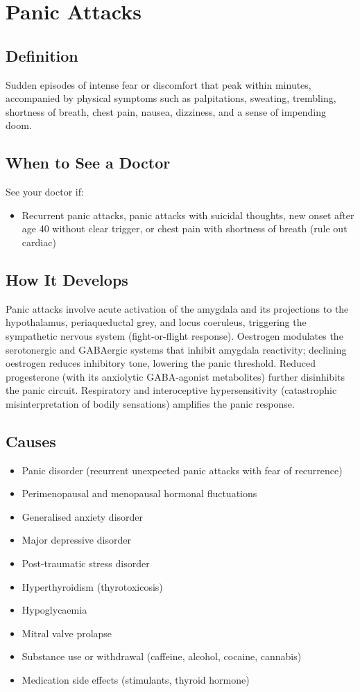 \chapter{Panic Attacks}

\section*{Definition}
Sudden episodes of intense fear or discomfort that peak within minutes, accompanied by physical symptoms such as palpitations, sweating, trembling, shortness of breath, chest pain, nausea, dizziness, and a sense of impending doom.

\section*{When to See a Doctor}
See your doctor if:
\begin{itemize}
  \item Recurrent panic attacks, panic attacks with suicidal thoughts, new onset after age 40 without clear trigger, or chest pain with shortness of breath (rule out cardiac)
\end{itemize}

\section*{How It Develops}
Panic attacks involve acute activation of the amygdala and its projections to the hypothalamus, periaqueductal grey, and locus coeruleus, triggering the sympathetic nervous system (fight-or-flight response). Oestrogen modulates the serotonergic and GABAergic systems that inhibit amygdala reactivity; declining oestrogen reduces inhibitory tone, lowering the panic threshold. Reduced progesterone (with its anxiolytic GABA-agonist metabolites) further disinhibits the panic circuit. Respiratory and interoceptive hypersensitivity (catastrophic misinterpretation of bodily sensations) amplifies the panic response.

\section*{Causes}
\begin{itemize}
  \item Panic disorder (recurrent unexpected panic attacks with fear of recurrence)
  \item Perimenopausal and menopausal hormonal fluctuations
  \item Generalised anxiety disorder
  \item Major depressive disorder
  \item Post-traumatic stress disorder
  \item Hyperthyroidism (thyrotoxicosis)
  \item Hypoglycaemia
  \item Mitral valve prolapse
  \item Substance use or withdrawal (caffeine, alcohol, cocaine, cannabis)
  \item Medication side effects (stimulants, thyroid hormone)
\end{itemize}

